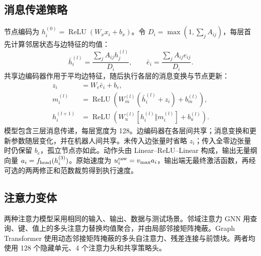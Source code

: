 \documentclass[conference]{IEEEtran}
\begin{document}
\subsection{消息传递策略}
节点编码为 $h_i^{(0)}=\operatorname{ReLU}(W_xx_i+b_x)$。令 $D_i=\max(1,\sum_jA_{ij})$，每层首先计算邻居状态与边特征的均值：
\begin{equation}
\bar h_i^{(l)}=\frac{\sum_jA_{ij}h_j^{(l)}}{D_i},\qquad
\bar e_i=\frac{\sum_jA_{ij}e_{ij}}{D_i}.
\end{equation}
共享边编码器作用于平均边特征，随后执行各层的消息变换与节点更新：
\begin{equation}
\begin{aligned}
z_i&=W_e\bar e_i+b_e,\\
m_i^{(l)}&=\operatorname{ReLU}\!\left(W_m^{(l)}(\bar h_i^{(l)}+z_i)+b_m^{(l)}\right),\\
h_i^{(l+1)}&=\operatorname{ReLU}\!\left(W_u^{(l)}[h_i^{(l)}\Vert m_i^{(l)}]+b_u^{(l)}\right).
\end{aligned}
\end{equation}
模型包含三层消息传递，每层宽度为 128。边编码器在各层间共享；消息变换和更新参数随层变化，并在机器人间共享。未传入边张量时省略 $z_i$；传入全零边张量时仍保留 $b_e$，孤立节点亦如此。动作头由 Linear--ReLU--Linear 构成，输出无量纲向量 $a_i=f_{\rm head}(h_i^{(3)})$。原始速度为 $u_i^{\rm raw}=v_{\max}a_i$，输出端无最终激活函数，再经可选的两两修正和范数裁剪得到执行速度。

\subsection{注意力变体}
两种注意力模型采用相同的输入、输出、数据与测试场景。邻域注意力 GNN 用查询、键、值上的多头注意力替换均值聚合，并由局部邻接矩阵掩蔽。Graph Transformer 使用动态邻接矩阵掩蔽的多头自注意力、残差连接与前馈块。两者均使用 128 个隐藏单元、4 个注意力头和共享策略头。
\end{document}

